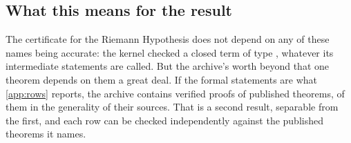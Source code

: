 \subsection{What this means for the result}
The certificate for the Riemann Hypothesis does not depend on any of these names being
accurate: the kernel checked a closed term of type , whatever its
intermediate statements are called. But the archive's worth beyond that one theorem depends on
them a great deal. If the formal statements are what \cref{app:rows} reports, the archive
contains verified proofs of \rowspublished{} published theorems, \rowsgeneral{} of them in the
generality of their sources. That is a second result, separable from the first, and each row
can be checked independently against the published theorems it names.
